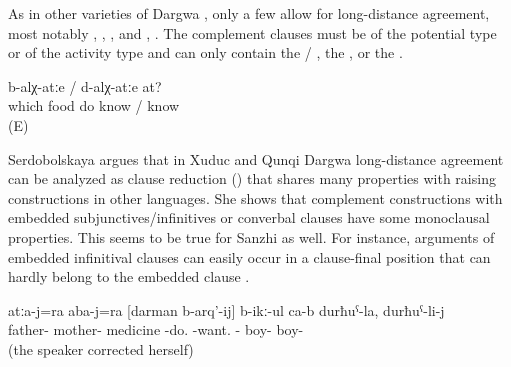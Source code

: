 As in other varieties of Dargwa \citep{Serdobolskaya2010}, only a few  allow for long-distance agreement, most notably  ,  ,  , and  , . The complement clauses must be of the potential type or of the activity type and can only contain the \slash {} , the  , or the  . 
%
\begin{exe}
	\ex	\label{ex:‎Which food do you know to cook}
		b-alχ-atːe	/	d-alχ-atːe	at?\\
		which	food	do	know	/	know	\\
	\glt	{} (E)
\end{exe}

Serdobolskaya \citeyearpar{Serdobolskaya2009, Serdobolskaya2010} argues that in Xuduc and Qunqi Dargwa long-distance agreement can be analyzed as clause reduction () that shares many properties with raising constructions in other languages. She shows that complement constructions with embedded subjunctives/infinitives or converbal clauses have some monoclausal properties. This seems to be true for Sanzhi as well. For instance, arguments of embedded infinitival clauses can easily occur in a clause-final position that can hardly belong to the embedded clause .

\begin{exe}
	\ex	\label{ex:The father and the mother want to give medicine of the son, to the son.}
	\gll	atːa-j=ra	aba-j=ra	[darman	b-arq'-ij]	b-ikː-ul	ca-b	durħuˁ-la,		durħuˁ-li-j\\
		father-	mother-	medicine	\tsc{n}-do.	-want.	-	boy-	boy-\\
	\glt	{} (the speaker corrected herself)
\end{exe}

